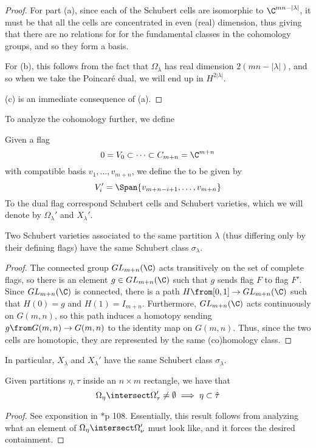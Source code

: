 \documentclass[11pt,leqno,oneside]{amsart}
\numberwithin{thm}{section}
\begin{document}
\begin{proof}
  For part (a), since each of the Schubert cells are isomorphic to
  \(\C^{mn-|\lambda|}\), it must be that all the cells are
  concentrated in even (real) dimension, thus giving that there are no
  relations for for the fundamental classes in the cohomology groups,
  and so they form a basis.

  For (b), this follows from the fact that \(\Omega_\lambda\) has real
  dimension \(2(mn-|\lambda|)\), and so when we take the Poincar\'{e}
  dual, we will end up in \(H^{2|\lambda|}\).

  (c) is an immediate consequence of (a).
\end{proof}
To analyze the cohomology further, we define
\begin{defn}
  Given a flag \[
    0 = V_0 \subset \cdots \subset C_{m+n} = \C^{m+n}
  \]
  with compatible basis \(v_1, \ldots, v_{m+n}\), we define the
   to be given by \[
    V_i' = \Span\{v_{m+n-i+1}, \ldots, v_{m+n}\}
  \]
  To the dual flag correspond Schubert cells and Schubert varieties,
  which we will denote by \(\Omega_\lambda'\) and \(X_\lambda'\).
\end{defn}
\begin{prop}
  Two Schubert varieties associated to the same partition \(\lambda\)
  (thus differing only by their defining flags)
  have the 
  same Schubert class \(\sigma_\lambda\).
\end{prop}
\begin{proof}
  The connected group \(GL_{m+n}(\C)\) acts transitively on the set of
  complete flags, so there is an element \(g \in GL_{m+n}(\C)\) such
  that \(g\) sends flag \(F\) to flag \(F'\). Since \(GL_{m+n}(\C)\)
  is connected,  there is a path \(H \from [0,1] \to GL_{m+n}(\C)\)
  such that \(H(0) = g\) and \(H(1) = I_{m+n}\).  Furthermore,
  \(GL_{m+n}(\C)\) acts continuously on 
  \(G(m,n)\), so this path induces a homotopy sending \(g \from G(m,n)
  \to G(m,n)\) to the identity map on \(G(m,n)\). Thus, since the two
  cells are homotopic, they are represented by the same (co)homology
  class. 
\end{proof} 
In particular, \(X_\lambda\) and \(X_\lambda'\) have the same
Schubert class \(\sigma_\lambda\).
\begin{lem}
  Given partitions \(\eta, \tau\) inside an \(n \times m\) rectangle,
  we have that \[
    \Omega_\eta \intersect \Omega_\tau' \neq \emptyset \implies \eta
    \subset \hat{\tau}
  \]
\end{lem}
\begin{proof}
  See exponsition in \cite{manivel}*{p 108}. Essentially, this result
  follows from analyzing what an element of \(\Omega_\eta \intersect
  \Omega_\nu'\) must look like, and it forces the desired containment.
\end{proof}
\end{document}

